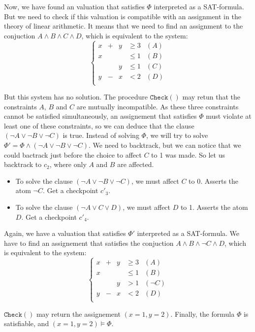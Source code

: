 \documentclass{article}
\newcommand{\icheck}{\mathtt{Check}()}
\begin{document}
Now, we have found an valuation that satisfies $\Phi$ interpreted as a
SAT-formula. But we need to check if this valuation is compatible with an
assignment in the theory of linear arithmetic. It means that we need to find an
assignment to the conjuction $A \wedge B \wedge C \wedge D$, which is equivalent
to the system:
\begin{displaymath}
  \left\{
  \begin{array}{ccccr}
    x  & + & y & \geqslant 3 & (A) \\
    x  &   &   & \leqslant 1 & (B) \\
       &   & y & \leqslant 1 & (C) \\
    y  & - & x & < 2         & (D) \\
  \end{array}
  \right.
\end{displaymath}

But this system has no solution. The procedure $\icheck$ may retun that the
constraints $A$, $B$ and $C$ are mutually incompatible. As these three
constraints cannot be satisfied simultaneously, an assignement that satisfies
$\Phi$ must violate at least one of these constraints, so we can deduce that the
clause $(\neg A \vee \neg B \vee \neg C)$ is true. Instead of solving $\Phi$, we
will try to solve $\Phi' = \Phi \wedge (\neg A \vee \neg B \vee \neg C)$. We
need to backtrack, but we can notice that we could bactrack just before
the choice to affect $C$ to 1 was made. So let us backtrack to $c_2$, where only
$A$ and $B$ are affected.

\begin{itemize}
  \item To solve the clause $(\neg A \vee \neg B \vee \neg C)$, we must affect
    $C$ to 0. Asserts the atom $\neg C$. Get a checkpoint $c'_3$.
  \item To solve the clause $(\neg A \vee C \vee D)$, we must affect $D$ to 1.
    Asserts the atom $D$. Get a checkpoint $c'_4$.
\end{itemize}

Again, we have a valuation that satisfies $\Phi'$ interpreted as a
SAT-formula. We have to find an assignement that satisfies the conjuction
$A \wedge B \wedge \neg C \wedge D$, which is equivalent
to the system:
\begin{displaymath}
  \left\{
  \begin{array}{ccccr}
    x  & + & y & \geqslant 3 & (A) \\
    x  &   &   & \leqslant 1 & (B) \\
       &   & y & > 1         & (\neg C) \\
    y  & - & x & < 2         & (D) \\
  \end{array}
  \right.
\end{displaymath}

$\icheck$ may return the assignement $(x=1, y=2)$. Finally, the formula $\Phi$
is satisfiable, and $(x=1, y=2) \vDash \Phi$.



\end{document}
